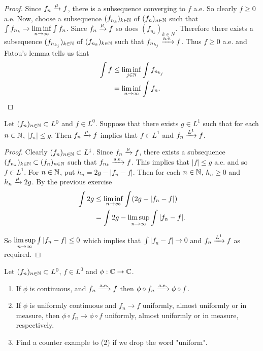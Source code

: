 \documentclass{book}
\begin{document}
	\begin{proof}
		Since $f_n \xrightarrow{\mu} f$, there is a subsequence converging to $f$ a.e. So clearly $f \geq 0$ a.e. Now, choose a subsequence $(f_{n_k})_{k \in \mathbb{N}}$ of $(f_n)_{n \in \mathbb{N}}$ such that $\int f_{n_k} \xrightarrow{} \liminf \limits_{n \rightarrow \infty} \int f_n$. Since $f_n \xrightarrow{\mu} f$ so does $(f_{n_k})_{k \in N}$. Therefore there exists a subsequence $(f_{n_{k_j}})_{k \in \mathbb{N}}$ of $(f_{n_k})_{k \in \mathbb{N}}$ such that $f_{n_{k_j}} \xrightarrow{\text{a.e.}} f$. Thus $f \geq 0 $ a.e. and Fatou's lemma tells us that 
		\begin{align*}
			\int f 
			&\leq \liminf_{j \in \mathbb{N}} \int f_{n_{k_j}}\\
			&= \liminf \limits_{n \rightarrow \infty} \int f_n.
		\end{align*}
	\end{proof}
	
	\begin{ex}  
		Let $(f_n)_{n \in \mathbb{N}} \subset L^0$ and $f \in L^0$. Suppose that there exists $g \in L^1$ such that for each $n \in \mathbb{N}$, $|f_n| \leq g$. Then $f_n \xrightarrow{\mu} f$ implies that $f \in L^1$ and $f_n \xrightarrow{L^1} f$. 
	\end{ex}
	
	\begin{proof}
		Clearly $(f_n)_{n \in \mathbb{N}} \subset L^1$. Since $f_n \xrightarrow{\mu} f$, there exists a subsequence $(f_{n_k})_{k \in \mathbb{N}} \subset (f_n)_{n \in \mathbb{N}}$ such that $f_{n_k} \xrightarrow{\text{a.e.}} f$. This implies that $|f| \leq g$ a.e. and so $f \in L^1$. For $n \in \mathbb{N}$, put $h_n = 2g - |f_n-f|$. Then for each $n \in \mathbb{N}$, $h_n \geq 0$ and $h_n \xrightarrow{\mu}2g$. By the previous exercise 
		\begin{align*}
			\int 2g 
			&\leq \liminf \limits_{n \rightarrow \infty} \int (2g - |f_n -f|)\\
			& = \int 2g - \limsup \limits_{n \rightarrow \infty} \int|f_n -f|.
		\end{align*}
		
		So $\limsup \limits_{n \rightarrow \infty} \int|f_n -f| \leq 0$ which implies that $\int|f_n -f| \rightarrow 0$ and $f_n \xrightarrow{L^1} f$ as required. 
	\end{proof}
	
	\begin{ex}  
		Let $(f_n)_{n \in \mathbb{N}} \subset L^0$, $f \in L^0$ and $\phi :\mathbb{C} \rightarrow \mathbb{C}$. 
		\begin{enumerate}
			\item If $\phi$ is continuous, and $f_n \xrightarrow{\text{a.e.}} f$ then $\phi \circ f_n \xrightarrow{\text{a.e.}} \phi \circ f$.
			\item If $\phi$ is uniformly continuous and $f_n \rightarrow f$ uniformly, almost uniformly or in measure, then $\phi \circ f_n \rightarrow \phi \circ f$ uniformly, almost uniformly or in measure, respectively.
			\item Find a counter example to (2) if we drop the word "uniform".
		\end{enumerate} 
	\end{ex}
	
\end{document}

